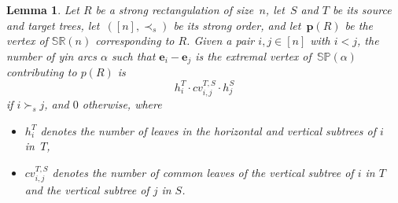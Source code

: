 \documentclass{amsart}
\newtheorem{lemma}[theorem]{Lemma}
\theoremstyle{definition}
\renewcommand{\b}[1]{{\boldsymbol{#1}}} %
\newcommand{\polytope}[1]{\mathds{#1}} %
\newcommand{\SRP}{\polytope{SR}} %
\newcommand{\SP}{\polytope{SP}}
\begin{document}
\begin{lemma}
  Let $R$ be a strong rectangulation of size~$n$, let~$S$ and $T$ be its source and target trees, let~$([n],\prec_s)$ be its strong order, and let~$\b{p}(R)$ be the vertex of $\SRP(n)$ corresponding to $R$.
  Given a pair $i,j\in [n]$ with $i<j$, the number of yin arcs $\alpha$ such that $\b{e}_i-\b{e}_j$ is the extremal vertex of~$\SP(\alpha)$ contributing to $p(R)$ is
  \[
    h^T_i \cdot cv^{T,S}_{i,j}\cdot h^S_j 
  \]
  if $i\succ_s j$, and $0$ otherwise, where
  \begin{itemize}
  \item $h^T_i$ denotes the number of leaves in the horizontal and vertical subtrees of $i$ in~$T$,
  \item $cv^{T,S}_{i,j}$ denotes the number of common leaves of the vertical subtree of $i$ in $T$ and the vertical subtree of $j$ in $S$.
  \end{itemize}  
\end{lemma}
\end{document}
